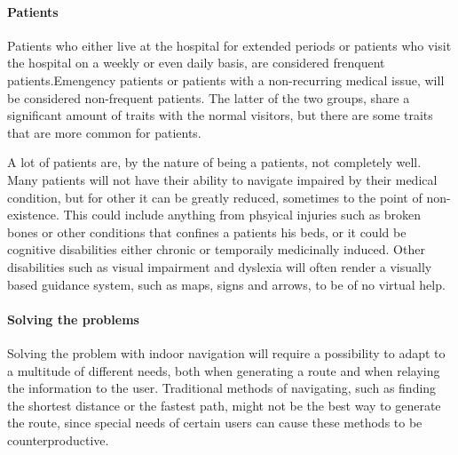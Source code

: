 
\paragraph{Patients} %

Patients who either live at the hospital for extended periods or patients who visit the hospital on a weekly or even daily basis, are considered frenquent patients.Emengency patients or patients with a non-recurring medical issue, will be considered non-frequent patients. The latter of the two groups, share a significant amount of traits with the normal visitors, but there are some traits that are more common for patients.

A lot of patients are, by the nature of being a patients, not completely well. Many patients will not have their ability to navigate impaired by their medical condition, but for other it can be greatly reduced, sometimes to the point of non-existence. This could include anything from phsyical injuries such as broken bones or other conditions that confines a patients his beds, or it could be cognitive disabilities either chronic or temporaily medicinally induced. Other disabilities such as visual impairment and dyslexia will often render a visually based guidance system, such as maps, signs and arrows, to be of no virtual help.


\paragraph{Solving the problems}

Solving the problem with indoor navigation will require a possibility to adapt to a multitude of different needs, both when generating a route and when relaying the information to the user. Traditional methods of navigating, such as finding the shortest distance or the fastest path, might not be the best way to generate the route, since special needs of certain users can cause these methods to be counterproductive.


